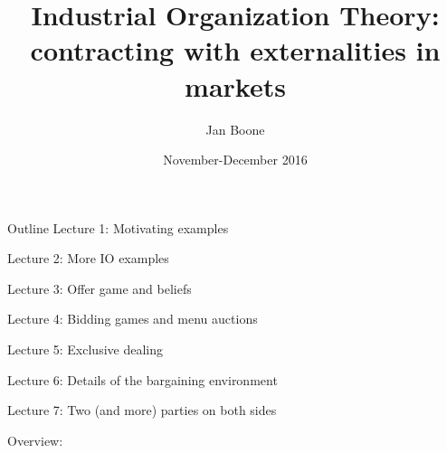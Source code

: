 \documentclass[11pt,english]{beamer}
\institute{Tilec}
\title{Industrial Organization Theory: contracting with externalities in markets}
\author{Jan Boone} \date{November-December 2016}
\begin{document}
\frame{\titlepage}

\begin{frame}[allowframebreaks]{Outline}
Lecture 1: Motivating examples

\tableofcontents[part=1,hideallsubsections]

\newpage

Lecture 2: More IO examples

\tableofcontents[part=2,hideallsubsections]


\newpage

Lecture 3: Offer game and beliefs

\tableofcontents[part=3,hideallsubsections]

Lecture 4: Bidding games and menu auctions

\tableofcontents[part=4,hideallsubsections]

\newpage

Lecture 5: Exclusive dealing

\tableofcontents[part=5,hideallsubsections]

Lecture 6: Details of the bargaining environment

\tableofcontents[part=6,hideallsubsections]

\newpage

Lecture 7: Two (and more) parties on both sides

\tableofcontents[part=7,hideallsubsections]

Overview:

\tableofcontents[part=8,hideallsubsections]

\end{frame}
\end{document}
